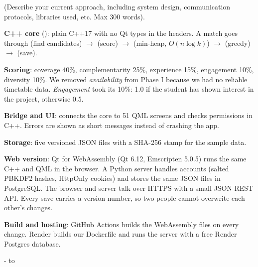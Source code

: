   {(Describe your current approach, including system design, communication protocols, libraries used, etc. Max 300 words).}
\TFgap{6.1bp}
\begin{answerbox}[6.6bp]
\begin{tfbullets}
\item \textbf{C++ core} (): plain C++17 with no Qt types in the headers. A match goes through
       (find candidates) $\rightarrow$  (score) $\rightarrow$
       (min-heap, $O(n\log k)$) $\rightarrow$  (greedy) $\rightarrow$
       (save).
\item \textbf{Scoring}: coverage 40\%, complementarity 25\%, experience 15\%, engagement 10\%, diversity 10\%.
      We removed \textit{availability} from Phase I because we had no reliable timetable data.
      \textit{Engagement} took its 10\%: 1.0 if the student has shown interest in the project, otherwise 0.5.
\item \textbf{Bridge and UI}:  connects the core to 51 QML screens and checks
      permissions in C++. Errors are shown as short messages instead of crashing the app.
\item \textbf{Storage}: five versioned JSON files with a SHA-256 stamp for the sample data.
\item \textbf{Web version}: Qt for WebAssembly (Qt 6.12, Emscripten 5.0.5) runs the same C++ and QML in the
      browser. A Python server handles accounts (salted PBKDF2 hashes, HttpOnly cookies) and stores the
      same JSON files in PostgreSQL. The browser and server talk over HTTPS with a small JSON REST API.
      Every save carries a version number, so two people cannot overwrite each other's changes.
\item \textbf{Build and hosting}: GitHub Actions builds the WebAssembly files on every change. Render builds
      our Dockerfile and runs the server with a free Render Postgres database.
\end{tfbullets}
\par\kern\dimexpr 9.4bp-\prevdepth\relax
\hbox to \hsize{\hss
\begin{tikzpicture}[x=1bp,y=-1bp,
    dbox/.style={draw=GEUBlue,line width=0.8bp,fill=GEUBlue!6,rounded corners=2.5bp},

\end{tikzpicture}}
\end{answerbox}
